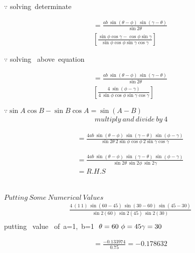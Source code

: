 \documentclass[journal,12pt,twocolumn]{IEEEtran}
\begin{document}
$\because$ solving~determinate 


\begin{multline}
=\frac{ab~\sin(\theta-\phi)~\sin(\gamma-\theta)}{ \sin2\theta}\\\left[\frac{\sin\phi\cos\gamma-\cos\phi\sin\gamma}{\sin\phi\cos\phi\sin\gamma\cos\gamma}
\right]
\end{multline}

$\because$ solving ~above~equation 

\begin{multline}
=\frac{ab~\sin(\theta-\phi)~\sin(\gamma-\theta)}{ \sin2\theta}\\\left[\frac{4~\sin(\phi-\gamma)}{4~\sin\phi\cos\phi\sin\gamma\cos\gamma}
\right]
\end{multline}


$\because \sin A\cos B - \sin B\cos A=\sin(A-B)$
\begin{align*}
~multiply ~and ~divide ~by ~4
\end{align*}

\begin{multline}
=\frac{4ab~\sin(\theta-\phi)~\sin(\gamma-\theta)~\sin(\phi-\gamma)}{ \sin2\theta~2\sin\phi\cos\phi~2\sin\gamma\cos\gamma}
\end{multline}

\begin{multline}
=\frac{4ab~\sin(\theta-\phi)~\sin(\gamma-\theta)~\sin(\phi-\gamma)}{ \sin2\theta~\sin2\phi~\sin2\gamma} \\= R.H.S
\end{multline}
\\\\
$Putting ~Some ~Numerical~ Values$
\begin{multline}
\frac{4~(1~1)~\sin(60-45)~\sin(30-60)~\sin(45-30)}{ \sin2(60)~\sin2(45)~\sin2(30)}\\
\end{multline}
putting~ value~ of~a=1,~b=1 $~\theta=60~\phi=45 \\ \gamma=30$

\begin{multline}
=\frac{-0.133974}{0.75}=-0.178632\\
\end{multline}
\end{document}
